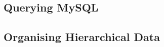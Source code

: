 \documentclass[Report.tex]{subfiles}
\begin{document}
\subsection{Querying MySQL}
\subsection{Organising Hierarchical Data}
\end{document}
